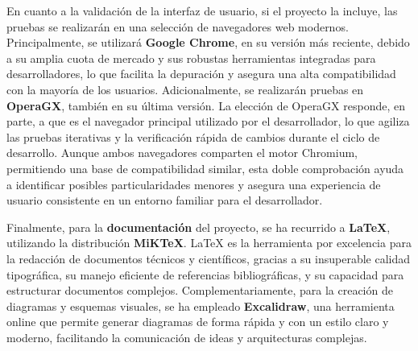 En cuanto a la validación de la interfaz de usuario, si el proyecto la incluye, las pruebas se realizarán en una selección de navegadores web modernos. Principalmente, se utilizará \textbf{Google Chrome}, en su versión más reciente, debido a su amplia cuota de mercado y sus robustas herramientas integradas para desarrolladores, lo que facilita la depuración y asegura una alta compatibilidad con la mayoría de los usuarios. Adicionalmente, se realizarán pruebas en \textbf{OperaGX}, también en su última versión. La elección de OperaGX responde, en parte, a que es el navegador principal utilizado por el desarrollador, lo que agiliza las pruebas iterativas y la verificación rápida de cambios durante el ciclo de desarrollo. Aunque ambos navegadores comparten el motor Chromium, permitiendo una base de compatibilidad similar, esta doble comprobación ayuda a identificar posibles particularidades menores y asegura una experiencia de usuario consistente en un entorno familiar para el desarrollador.

Finalmente, para la \textbf{documentación} del proyecto, se ha recurrido a \textbf{LaTeX}, utilizando la distribución \textbf{MiKTeX}. LaTeX es la herramienta por excelencia para la redacción de documentos técnicos y científicos, gracias a su insuperable calidad tipográfica, su manejo eficiente de referencias bibliográficas, y su capacidad para estructurar documentos complejos. Complementariamente, para la creación de diagramas y esquemas visuales, se ha empleado \textbf{Excalidraw}, una herramienta online que permite generar diagramas de forma rápida y con un estilo claro y moderno, facilitando la comunicación de ideas y arquitecturas complejas.


